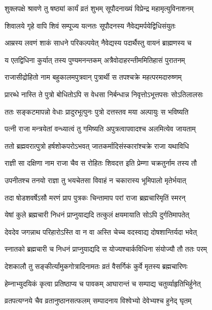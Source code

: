 \twolineshloka
{शुक्लपक्षे श्रावणे तु षष्ठ्यां कार्यं व्रतं शुभम्}
{सूपौदनाख्यं विप्रेन्द्र महामृत्युविनाशनम्} %

\twolineshloka
{शिवालये गृहे वापि शिवं सम्पूज्य यत्नतः}
{सूपौदनस्य नैवेद्यमर्पयेद्विधिसंयुतः} %

\twolineshloka
{आम्रस्य लवणं शाकं साधने परिकल्पयेत्}
{नैवेद्यस्य पदार्थैस्तु वायनं ब्राह्मणस्य च} %

\twolineshloka
{य एतद्विधिना कुर्यात् तस्य पुण्यमनन्तकम्}
{अत्रैवोदाहरन्तीममितिहासं पुरातनम्} %

\twolineshloka
{राजासीद्रोहितो नाम बहुकालमपुत्रवान्}
{पुत्रार्थी स तपश्चक्रे महत्परमदारुष्णम्} %

\twolineshloka
{प्रारब्धे नास्ति ते पुत्रो बोधितोऽपि स वेधसा}
{निर्बन्धान्न निवृत्तोऽभूत्तपसः सोऽतिलालसः} %

\twolineshloka
{ततः सङ्कटमापन्नो वेधाः प्रादुरभूत्पुनः}
{पुत्रो दत्तस्तव मया अल्पायुः स भविष्यति} %

\twolineshloka
{पत्नी राजा मन्त्रयेतां वन्ध्यात्वं तु गमिष्यति}
{अपुत्रत्वापवादश्च अलमित्येव जायताम्} %

\twolineshloka
{ततो ब्रह्मवरात्पुत्रो हर्षशोकपरोऽभवत्}
{जातकर्मादिसंस्कारांश्चक्रे राजा यथाविधि} %

\twolineshloka
{राज्ञी सा दक्षिणा नाम राजा चैव स रोहितः}
{शिवदत्त इति प्रेम्णा चक्रतुर्नाम तस्य तौ} %

\twolineshloka
{उपनीतश्च तनयो राज्ञा तु भयचेतसा}
{विवाहं न चकारास्य भूमिपालो मृतेर्भयात्} %

\twolineshloka
{तदा षोडशवर्षेऽसौ मरणं प्राप पुत्रकः}
{चिन्तामाप परां राजा ब्रह्मचारिमृतिं स्मरन्} %

\twolineshloka
{येषां कुले ब्रह्मचारी निधनं प्राप्नुयाद्यदि}
{तत्कुलं क्षयमायाति सोऽपि दुर्गतिमापतेत्} %


\twolineshloka
{देवदेव जगन्नाथ परिहारोऽस्ति वा न वा}
{अस्ति चेच्च वदस्वाद्य दोषशान्तिर्यदा भवेत्} %


\twolineshloka
{स्नातको ब्रह्मचारी च निधनं प्राप्नुयाद्यदि}
{स योज्यश्चार्कविधिना संयोज्यौ तौ ततः परम्} %

\twolineshloka
{देशकालौ तु सङ्कीर्त्यांमुकगोत्रादिनामतः}
{व्रतं वैसर्गिकं कुर्वे मृतस्य ब्रह्मचारिणः} %

\twolineshloka
{हेम्नाभ्युदयिकं कृत्वा प्रतिष्ठाप्य च पावकम्}
{आघारान्तं च सम्पाद्य चतुर्व्याहृतिभिर्हुनेत्} %

\twolineshloka
{व्रतपत्यग्नये चैव व्रतानुष्ठानसत्फलम्}
{सम्पादनाय विश्वेभ्यो देवेभ्यश्च हुनेद् घृतम्} %

